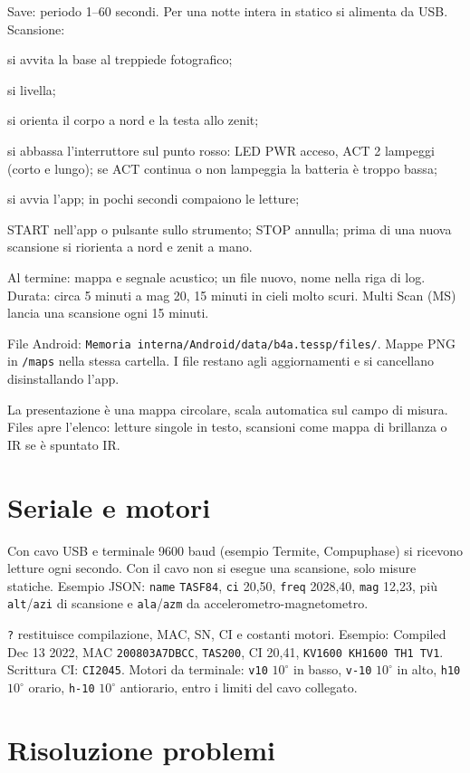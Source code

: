\documentclass[11pt,a4paper]{report}
\begin{document}
Save: periodo 1--60 secondi. Per una notte intera in statico si alimenta da USB. Scansione:

si avvita la base al treppiede fotografico;

si livella;

si orienta il corpo a nord e la testa allo zenit;

si abbassa l'interruttore sul punto rosso: LED PWR acceso, ACT 2 lampeggi (corto e lungo); se ACT continua o non lampeggia la batteria è troppo bassa;

si avvia l'app; in pochi secondi compaiono le letture;

START nell'app o pulsante sullo strumento; STOP annulla; prima di una nuova scansione si riorienta a nord e zenit a mano.

Al termine: mappa e segnale acustico; un file nuovo, nome nella riga di log. Durata: circa 5 minuti a mag 20, 15 minuti in cieli molto scuri. Multi Scan (MS) lancia una scansione ogni 15 minuti.

File Android: \texttt{Memoria interna/Android/data/b4a.tessp/files/}. Mappe PNG in \texttt{/maps} nella stessa cartella. I file restano agli aggiornamenti e si cancellano disinstallando l'app.

La presentazione è una mappa circolare, scala automatica sul campo di misura. Files apre l'elenco: letture singole in testo, scansioni come mappa di brillanza o IR se è spuntato IR.

\section{Seriale e motori}

Con cavo USB e terminale 9600 baud (esempio Termite, Compuphase) si ricevono letture ogni secondo. Con il cavo non si esegue una scansione, solo misure statiche. Esempio JSON: \texttt{name} \texttt{TASF84}, \texttt{ci} 20,50, \texttt{freq} 2028,40, \texttt{mag} 12,23, più \texttt{alt}/\texttt{azi} di scansione e \texttt{ala}/\texttt{azm} da accelerometro-magnetometro.

\texttt{?} restituisce compilazione, MAC, SN, CI e costanti motori. Esempio: Compiled Dec 13 2022, MAC \texttt{200803A7DBCC}, \texttt{TAS200}, CI 20,41, \texttt{KV1600 KH1600 TH1 TV1}. Scrittura CI: \texttt{CI2045}. Motori da terminale: \texttt{v10} $10^\circ$ in basso, \texttt{v-10} $10^\circ$ in alto, \texttt{h10} $10^\circ$ orario, \texttt{h-10} $10^\circ$ antiorario, entro i limiti del cavo collegato.

\section{Risoluzione problemi}
\end{document}
